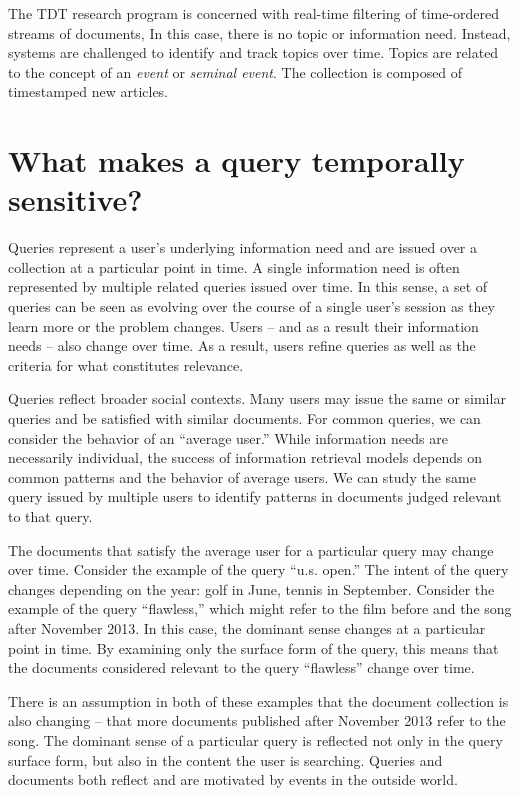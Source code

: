 \documentclass{sig-alternate}
\begin{document}
The TDT research program is concerned with real-time filtering of time-ordered streams of documents, In this case, there is no topic or information need. Instead, systems are challenged to identify and track topics over time. Topics are related to the concept of an \emph{event} or \emph{seminal event}.  The collection is composed of timestamped new articles.


\section{What makes a query temporally sensitive?}

Queries represent a user's underlying information need and are issued over a collection at a particular point in time.  A single information need is often represented by multiple related queries issued over time. In this sense, a set of queries can be seen as evolving over the course of a single user's session as they learn more or the problem changes. Users -- and as a result their information needs -- also change over time. As a result, users refine queries as well as the criteria for what constitutes relevance. 

Queries reflect broader social contexts. Many users may issue the same or similar queries and be satisfied with similar documents.  For common queries, we can consider the behavior of an ``average user.'' While information needs are necessarily individual, the success of information retrieval models depends on common patterns and the behavior of average users. We can study the same query issued by multiple users to identify patterns in documents judged relevant to that query. 

The documents that satisfy the average user for a particular query may change over time.  Consider the example of the query ``u.s. open.'' The intent of the query changes depending on the year: golf in June, tennis in September.  Consider the example of the query ``flawless,'' which might refer to the film before and the song after November 2013. In this case, the dominant sense changes at a particular point in time. By examining only the surface form of the query, this means that the documents considered relevant to the query ``flawless'' change over time.  

There is an assumption in both of these examples that the document collection is also changing -- that more documents published after November 2013 refer to the song. The dominant sense of a particular query is reflected not only in the query surface form, but also in the content the user is searching.  Queries and documents both reflect and are motivated by events in the outside world.
\end{document}
